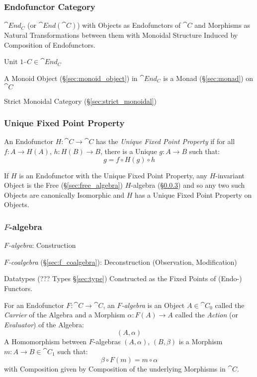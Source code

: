\subsubsection{Endofunctor Category}\label{sec:endofunctor_category}

$\cat{End_C}$ (or $\cat{End}(\cat{C})$) with Objects as
Endofunctors of $\cat{C}$ and Morphisms as Natural Transformations
between them with Monoidal Structure Induced by Composition of
Endofunctors.

Unit $1_\cat{C} \in \cat{End_C}$

A Monoid Object (\S\ref{sec:monoid_object}) in $\cat{End_C}$ is a
Monad (\S\ref{sec:monad}) on $\cat{C}$

Strict Monoidal Category (\S\ref{sec:strict_monoidal})



\subsubsection{Unique Fixed Point Property}\label{sec:ufpp}

An Endofunctor $H : \cat{C} \rightarrow \cat{C}$ has the \emph{Unique
  Fixed Point Property} if for all $f : A \rightarrow H(A)$, $h : H(B)
\rightarrow B$, there is a Unique $g : A \rightarrow B$ such that:
\[
  g = f \circ H(g) \circ h
\]

If $H$ is an Endofunctor with the Unique Fixed Point Property, any
$H$-invariant Object is the Free (\S\ref{sec:free_algebra})
$H$-algebra (\S\ref{sec:f_algebra}) and so any two such Objects are
canonically Isomorphic and $H$ has a Unique Fixed Point Property on
Objects.



\subsubsection{$F$-algebra}\label{sec:f_algebra}

\emph{$F$-algebra}: Construction

\emph{$F$-coalgebra} (\S\ref{sec:f_coalgebra}): Deconstruction
(Observation, Modification)

Datatypes (??? Types \S\ref{sec:type}) Constructed as the Fixed Points
of (Endo-) Functors. \cite{jones95} %

For an Endofunctor $F : \cat{C} \rightarrow \cat{C}$, an
\emph{$F$-algebra} is an Object $A \in \cat{C}_0$ called the
\emph{Carrier} of the Algebra and a Morphism $\alpha : F (A)
\rightarrow A$ called the \emph{Action} (or \emph{Evaluator}) of the
Algebra: \cite{corfield08}
\[
  (A,\alpha)
\]
A Homomorphism between $F$-algebras $(A,\alpha)$, $(B,\beta)$ is a
Morphism $m : A \rightarrow B \in \cat{C}_1$ such that:
\[
  \beta \circ F(m) = m \circ \alpha
\]
with Composition given by Composition of the underlying Morphisms in
$\cat{C}$.

